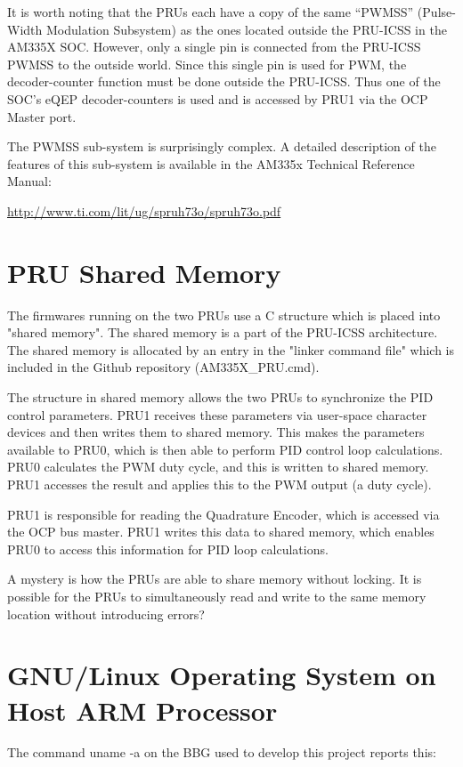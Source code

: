 It is worth noting that the PRUs each have a copy of the same ``PWMSS'' (Pulse-Width Modulation Subsystem) as the ones located outside the PRU-ICSS in the AM335X SOC.  However, only a single pin is connected from the PRU-ICSS PWMSS to the outside world.  Since this single pin is used for PWM, the decoder-counter function must be done outside the PRU-ICSS. Thus one of the SOC's eQEP decoder-counters is used and is accessed by PRU1 via the OCP Master port.

The PWMSS sub-system is surprisingly complex.  A detailed description of the features of this sub-system is available in the AM335x Technical Reference Manual:

\url{http://www.ti.com/lit/ug/spruh73o/spruh73o.pdf}

\section{PRU Shared Memory}

The firmwares running on the two PRUs use a C structure which is placed into "shared memory".  The shared memory is a part of the PRU-ICSS architecture.  The shared memory is allocated by an entry in the "linker command file" which is included in the Github repository (AM335X\_PRU.cmd).

The structure in shared memory allows the two PRUs to synchronize the PID control parameters.  PRU1 receives these parameters via user-space character devices and then writes them to shared memory.  This makes the parameters available to PRU0, which is then able to perform PID control loop calculations.  PRU0 calculates the PWM duty cycle, and this is written to shared memory.  PRU1 accesses the result and applies this to the PWM output (a duty cycle).

PRU1 is responsible for reading the Quadrature Encoder, which is accessed via the OCP bus master.  PRU1 writes this data to shared memory, which enables PRU0 to access this information for PID loop calculations.

A mystery is how the PRUs are able to share memory without locking.  It is possible for the PRUs to simultaneously read and write to the same memory location without introducing errors?

\section{GNU/Linux Operating System on Host ARM Processor}

The command uname -a on the BBG used to develop this project reports this:

